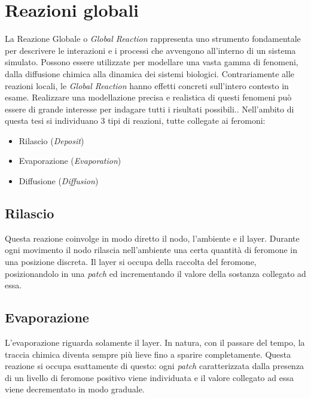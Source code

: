 \section{Reazioni globali}
La Reazione Globale o \textit{Global Reaction} rappresenta uno strumento fondamentale per descrivere
le interazioni e i processi che avvengono all'interno di un sistema simulato.
Possono essere utilizzate per modellare una vasta gamma di fenomeni, dalla diffusione chimica alla dinamica dei sistemi biologici.
Contrariamente alle reazioni locali, le \textit{Global Reaction} hanno effetti concreti sull'intero contesto in esame. 
Realizzare una modellazione precisa e realistica di questi fenomeni può essere di grande interesse per indagare tutti i risultati possibili.. 
Nell'ambito di questa tesi si individuano 3 tipi di reazioni, tutte collegate ai feromoni:
\begin{itemize}
    \item Rilascio (\textit{Deposit})
    \item Evaporazione (\textit{Evaporation})
    \item Diffusione (\textit{Diffusion})
\end{itemize}
\subsection{Rilascio}
Questa reazione coinvolge in modo diretto il nodo, l'ambiente e il layer. Durante ogni movimento il nodo rilascia 
nell'ambiente una certa quantità di feromone in una posizione discreta. Il layer si occupa della raccolta del feromone,
posizionandolo in una \textit{patch} ed incrementando il valore della sostanza collegato ad essa.
\subsection{Evaporazione}
L'evaporazione riguarda solamente il layer. In natura, con il passare del tempo, la traccia chimica diventa sempre più
lieve fino a sparire completamente. Questa reazione si occupa esattamente di questo: ogni \textit{patch} caratterizzata
dalla presenza di un livello di feromone positivo viene individuata e il valore collegato ad essa viene decrementato in modo graduale.
